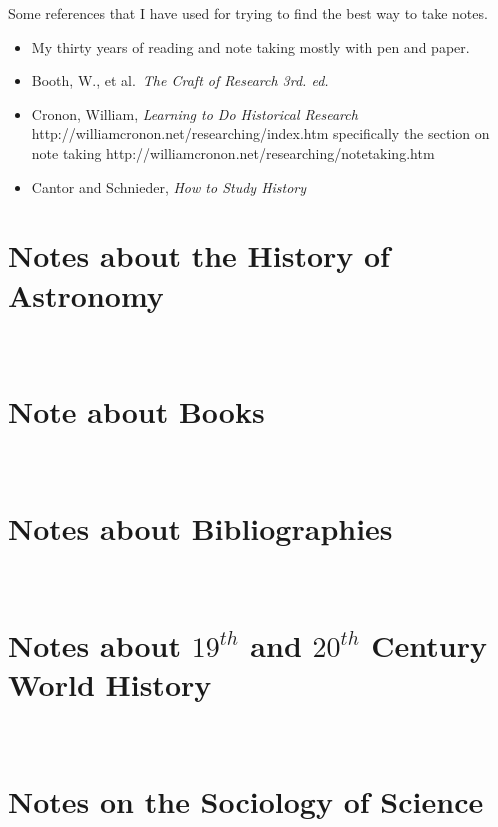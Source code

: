 \documentclass{article}
\begin{document}
Some references that I have used for trying to find the best way to take
notes.
\begin{itemize}
\item My thirty years of reading and note taking mostly with pen and  paper.
\item Booth, W., et al.\ {\it The Craft of Research 3rd. ed.}
  \cite{booth:2008}
\item Cronon, William, {\it Learning to Do Historical Research}
  http://williamcronon.net/researching/index.htm specifically the
  section on note taking
  http://williamcronon.net/researching/notetaking.htm
  \cite{cronon:2008}
\item Cantor and Schnieder, {\it How to Study History} \cite{cantor:1967}
\end{itemize}



\section{Notes about the History of Astronomy}\


\section{Note about Books}\


\section{Notes about Bibliographies}\


\section{Notes about \ensuremath{19^{th}} and \ensuremath{20^{th}} Century World History}\


%

\section{Notes on the Sociology of Science}\


\vfil\eject



\end{document}
